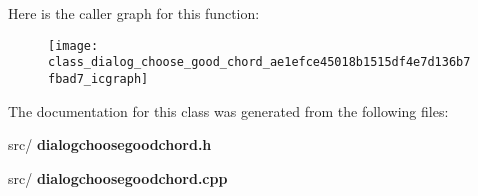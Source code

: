 Here is the caller graph for this function\+:\nopagebreak
\begin{figure}[H]
\begin{center}
\leavevmode
\texttt{[image: class\_dialog\_choose\_good\_chord\_ae1efce45018b1515df4e7d136b7fbad7\_icgraph]}
\end{center}
\end{figure}


The documentation for this class was generated from the following files\+:\begin{DoxyCompactItemize}
\item 
src/\textbf{ dialogchoosegoodchord.\+h}\item 
src/\textbf{ dialogchoosegoodchord.\+cpp}\end{DoxyCompactItemize}
